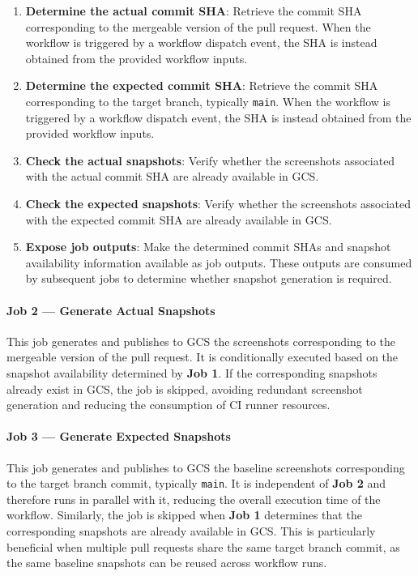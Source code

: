 \begin{enumerate}
    \item \textbf{Determine the actual commit SHA}: Retrieve the commit SHA corresponding to the mergeable version of the pull request. When the workflow is triggered by a workflow dispatch event, the SHA is instead obtained from the provided workflow inputs.

    \item \textbf{Determine the expected commit SHA}: Retrieve the commit SHA corresponding to the target branch, typically \texttt{main}. When the workflow is triggered by a workflow dispatch event, the SHA is instead obtained from the provided workflow inputs.

    \item \textbf{Check the actual snapshots}: Verify whether the screenshots associated with the actual commit SHA are already available in \ac{GCS}.

    \item \textbf{Check the expected snapshots}: Verify whether the screenshots associated with the expected commit SHA are already available in \ac{GCS}.

    \item \textbf{Expose job outputs}: Make the determined commit SHAs and snapshot availability information available as job outputs. These outputs are consumed by subsequent jobs to determine whether snapshot generation is required.
\end{enumerate}

\paragraph{Job 2 --- Generate Actual Snapshots}

This job generates and publishes to \ac{GCS} the screenshots corresponding to the mergeable version of the pull request. It is conditionally executed based on the snapshot availability determined by \textbf{Job 1}. If the corresponding snapshots already exist in \ac{GCS}, the job is skipped, avoiding redundant screenshot generation and reducing the consumption of CI runner resources.

\paragraph{Job 3 --- Generate Expected Snapshots}

This job generates and publishes to \ac{GCS} the baseline screenshots corresponding to the target branch commit, typically \texttt{main}. It is independent of \textbf{Job 2} and therefore runs in parallel with it, reducing the overall execution time of the workflow. Similarly, the job is skipped when \textbf{Job 1} determines that the corresponding snapshots are already available in \ac{GCS}. This is particularly beneficial when multiple pull requests share the same target branch commit, as the same baseline snapshots can be reused across workflow runs.

